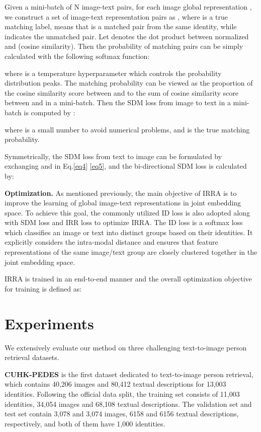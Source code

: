 \documentclass[10pt,twocolumn,letterpaper]{article}
\begin{document}
Given a mini-batch of N image-text pairs, for each image global representation , we construct a set of image-text representation pairs as , where  is a true matching label,  means that  is a matched pair from the same identity, while  indicates the unmatched pair. Let  denotes the dot product between  normalized  and  (\ie cosine similarity).
Then the probability of matching pairs can be simply calculated with the following softmax function: 

where  is a temperature hyperparameter which controls the probability distribution peaks. The matching probability  can be viewed as the proportion of the cosine similarity score between  and  to the sum of cosine similarity score between  and  in a mini-batch. Then the SDM loss from image to text in a mini-batch is computed by :

where  is a small number to avoid numerical problems, and  is the true matching probability. 

Symmetrically, the SDM loss from text to image  can be formulated by exchanging  and  in Eq.\eqref{eq4} \eqref{eq5}, and the bi-directional SDM loss is calculated by:


\textbf{Optimization.}
As mentioned previously, the main objective of IRRA is to improve the learning of global image-text representations in joint embedding space. To achieve this goal, the commonly utilized ID loss\cite{zheng2020dual} is also adopted along with SDM loss and IRR loss to optimize IRRA. The ID loss is a softmax loss which classifies an image or text into distinct groups based on their identities. It explicitly considers the intra-modal distance and ensures that feature representations of the same image/text group are closely clustered together in the joint embedding space.

IRRA is trained in an end-to-end manner and the overall optimization objective for training is defined as:


\section{Experiments}
We extensively evaluate our method on three challenging text-to-image person retrieval datasets.

\textbf{CUHK-PEDES} \cite{li2017person} is the first dataset dedicated to text-to-image person retrieval, which contains 40,206 images and 80,412 textual descriptions for 13,003 identities. Following the official data split, the training set consists of 11,003 identities, 34,054 images and 68,108 textual descriptions. The validation set and test set contain 3,078 and 3,074 images, 6158 and 6156 textual descriptions, respectively, and both of them have 1,000 identities.
\end{document}

